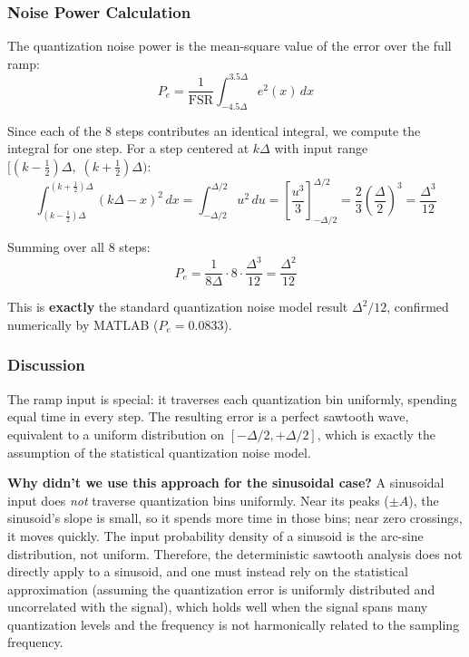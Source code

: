 \documentclass{article}
\begin{document}
  \subsubsection{Noise Power Calculation}

  The quantization noise power is the mean-square value of the error over the full ramp:
  \begin{equation}
      P_e = \frac{1}{\text{FSR}} \int_{-4.5\Delta}^{3.5\Delta} e^2(x)\, dx
  \end{equation}

  Since each of the 8 steps contributes an identical integral, we compute the integral for one step. For a step centered at
  $k\Delta$ with input range $[(k-\tfrac{1}{2})\Delta,\; (k+\tfrac{1}{2})\Delta)$:
  \begin{equation}
      \int_{(k-\frac{1}{2})\Delta}^{(k+\frac{1}{2})\Delta} (k\Delta - x)^2\, dx
      = \int_{-\Delta/2}^{\Delta/2} u^2\, du
      = \left[\frac{u^3}{3}\right]_{-\Delta/2}^{\Delta/2}
      = \frac{2}{3}\left(\frac{\Delta}{2}\right)^3
      = \frac{\Delta^3}{12}
  \end{equation}

  Summing over all 8 steps:
  \begin{equation}
      P_e = \frac{1}{8\Delta} \cdot 8 \cdot \frac{\Delta^3}{12} = \boxed{\frac{\Delta^2}{12}}
  \end{equation}

  This is \textbf{exactly} the standard quantization noise model result $\Delta^2/12$, confirmed numerically by MATLAB ($P_e =
  0.0833$).

  \subsubsection{Discussion}

  The ramp input is special: it traverses each quantization bin uniformly, spending equal time in every step. The resulting
  error is a perfect sawtooth wave, equivalent to a uniform distribution on $[-\Delta/2, +\Delta/2]$, which is exactly the
  assumption of the statistical quantization noise model.

  \textbf{Why didn't we use this approach for the sinusoidal case?}
  A sinusoidal input does \emph{not} traverse quantization bins uniformly. Near its peaks ($\pm A$), the sinusoid's slope is
  small, so it spends more time in those bins; near zero crossings, it moves quickly. The input probability density of a
  sinusoid is the arc-sine distribution, not uniform. Therefore, the deterministic sawtooth analysis does not directly apply to
  a sinusoid, and one must instead rely on the statistical approximation (assuming the quantization error is uniformly
  distributed and uncorrelated with the signal), which holds well when the signal spans many quantization levels and the
  frequency is not harmonically related to the sampling frequency.
\end{document}
